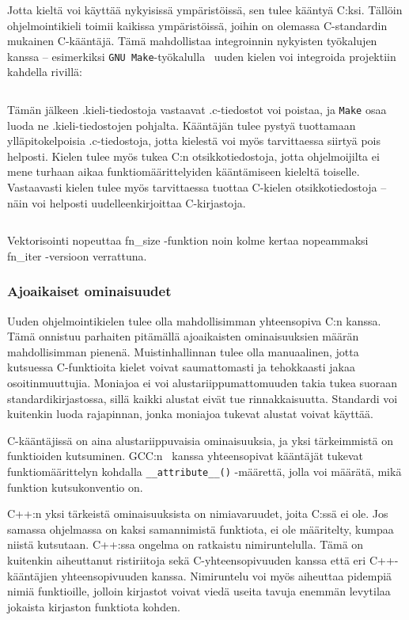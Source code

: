 Jotta kieltä voi käyttää nykyisissä ympäristöissä, sen tulee kääntyä C:ksi.
Tällöin ohjelmointikieli toimii kaikissa ympäristöissä, joihin on olemassa
C-standardin mukainen C-kääntäjä. Tämä mahdollistaa integroinnin nykyisten
työkalujen kanssa -- esimerkiksi \texttt{GNU Make}-työkalulla~\citep{gnumake}
uuden kielen voi integroida projektiin kahdella rivillä:

\inputminted{make}{Makefile.kieli}

Tämän jälkeen .kieli-tiedostoja vastaavat .c-tiedostot voi poistaa, ja
\texttt{Make} osaa luoda ne .kieli-tiedostojen pohjalta. Kääntäjän tulee pystyä
tuottamaan ylläpitokelpoisia .c-tiedostoja, jotta kielestä voi myös
tarvittaessa siirtyä pois helposti.  Kielen tulee myös tukea C:n
otsikkotiedostoja, jotta ohjelmoijilta ei mene turhaan aikaa
funktiomäärittelyiden kääntämiseen kieleltä toiselle. Vastaavasti kielen tulee
myös tarvittaessa tuottaa C-kielen otsikkotiedostoja -- näin voi helposti
uudelleenkirjoittaa C-kirjastoja.

\begin{listing}[ht!]
    \inputminted[firstline=4]{C}{vectorization.c}

    \caption{Vektorisointi nopeuttaa fn\_size -funktion noin kolme kertaa
    nopeammaksi fn\_iter -versioon verrattuna.}
\end{listing}

\subsubsection{Ajoaikaiset ominaisuudet}

Uuden ohjelmointikielen tulee olla mahdollisimman yhteensopiva C:n kanssa. Tämä
onnistuu parhaiten pitämällä ajoaikaisten ominaisuuksien määrän mahdollisimman
pienenä. Muistinhallinnan tulee olla manuaalinen, jotta kutsuessa C-funktioita
kielet voivat saumattomasti ja tehokkaasti jakaa osoitinmuuttujia. Moniajoa ei
voi alustariippumattomuuden takia tukea suoraan standardikirjastossa, sillä
kaikki alustat eivät tue rinnakkaisuutta. Standardi voi kuitenkin luoda
rajapinnan, jonka moniajoa tukevat alustat voivat käyttää.

C-kääntäjissä on aina alustariippuvaisia ominaisuuksia, ja yksi tärkeimmistä on
funktioiden kutsuminen. GCC:n~\citep{gcc} kanssa yhteensopivat kääntäjät
tukevat funktiomäärittelyn kohdalla \texttt{\_\_attribute\_\_()} -määrettä,
jolla voi määrätä, mikä funktion kutsukonventio on.

C++:n yksi tärkeistä ominaisuuksista on nimiavaruudet, joita C:ssä ei ole. Jos
samassa ohjelmassa on kaksi samannimistä funktiota, ei ole määritelty, kumpaa
niistä kutsutaan. C++:ssa ongelma on ratkaistu nimiruntelulla. Tämä on
kuitenkin aiheuttanut ristiriitoja sekä C-yhteensopivuuden kanssa että eri
C++-kääntäjien yhteensopivuuden kanssa. Nimiruntelu voi myös aiheuttaa pidempiä
nimiä funktioille, jolloin kirjastot voivat viedä useita tavuja enemmän
levytilaa jokaista kirjaston funktiota kohden.

